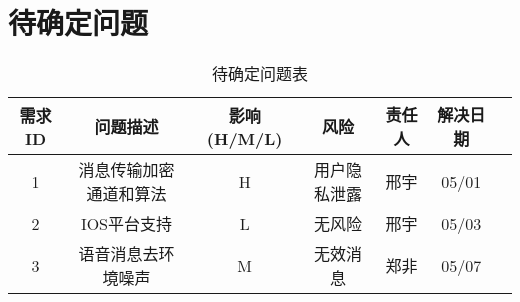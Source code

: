 \chapter{待确定问题}
\begin{table}[htbp]
\centering
\caption{待确定问题表} \label{tab:tbd_problems}
\begin{tabular}{|c|c|c|c|c|c|c}
    \hline
    需求ID & 问题描述 & 影响(H/M/L) & 风险 & 责任人 & 解决日期  \\
    \hline
    1 & 消息传输加密通道和算法 & H &用户隐私泄露 & 邢宇 & 05/01\\
    \hline
    2 & IOS平台支持 & L & 无风险 & 邢宇 & 05/03\\
    \hline
    3 & 语音消息去环境噪声 & M & 无效消息  & 郑非 & 05/07\\
    \hline
\end{tabular}
\end{table} 